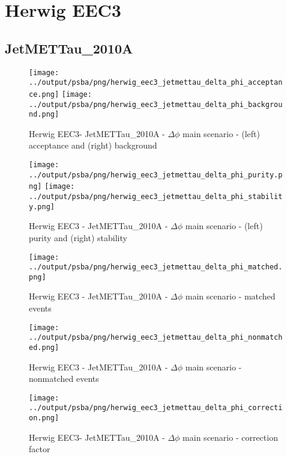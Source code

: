 \documentclass[11pt]{book}
\begin{document}
\clearpage

\section{Herwig EEC3}
\subsection{JetMETTau\_2010A}

\begin{figure}[ht]
\centering
\texttt{[image: ../output/psba/png/herwig\_eec3\_jetmettau\_delta\_phi\_acceptance.png]}
\texttt{[image: ../output/psba/png/herwig\_eec3\_jetmettau\_delta\_phi\_background.png]}
\caption{Herwig EEC3- JetMETTau\_2010A - $\Delta\phi$ main scenario - (left) acceptance and (right) background}
\label{fig:hw_eec3_jetmettau_delta_phi_ab}
\end{figure}

\begin{figure}[ht]
\centering
\texttt{[image: ../output/psba/png/herwig\_eec3\_jetmettau\_delta\_phi\_purity.png]}
\texttt{[image: ../output/psba/png/herwig\_eec3\_jetmettau\_delta\_phi\_stability.png]}
\caption{Herwig EEC3 - JetMETTau\_2010A - $\Delta\phi$ main scenario - (left) purity and (right) stability}
\label{fig:hw_eec3_jetmettau_delta_phi_ps}
\end{figure}

\begin{figure}[ht]
\centering
\texttt{[image: ../output/psba/png/herwig\_eec3\_jetmettau\_delta\_phi\_matched.png]}
\caption{Herwig EEC3 - JetMETTau\_2010A - $\Delta\phi$ main scenario - matched events}
\label{fig:hw_eec3_jetmettau_delta_phi_matched}
\end{figure}

\begin{figure}[ht]
\centering
\texttt{[image: ../output/psba/png/herwig\_eec3\_jetmettau\_delta\_phi\_nonmatched.png]}
\caption{Herwig EEC3 - JetMETTau\_2010A - $\Delta\phi$ main scenario - nonmatched events}
\label{fig:hw_eec3_jetmettau_delta_phi_nonmatched}
\end{figure}

\begin{figure}[ht]
\centering
\texttt{[image: ../output/psba/png/herwig\_eec3\_jetmettau\_delta\_phi\_correction.png]}
\caption{Herwig EEC3- JetMETTau\_2010A - $\Delta\phi$ main scenario - correction factor}
\label{fig:hw_eec3_jetmettau_delta_phi_correction}
\end{figure}
\end{document}
